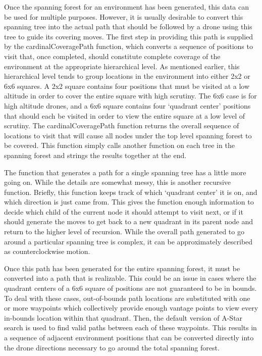 Once the spanning forest for an environment has been generated, this data can be used for multiple purposes. However, it is usually desirable to convert this spanning tree into the actual path that should be followed by a drone using this tree to guide its covering moves. The first step in providing this path is supplied by the cardinalCoveragePath function, which converts a sequence of positions to visit that, once completed, should constitute complete coverage of the environment at the appropriate hierarchical level. As mentioned earlier, this hierarchical level tends to group locations in the environment into either 2x2 or 6x6 squares. A 2x2 square contains four positions that must be visited at a low altitude in order to cover the entire square with high scrutiny. The 6x6 case is for high altitude drones, and a 6x6 square contains four `quadrant center' positions that should each be visited in order to view the entire square at a low level of scrutiny. The cardinalCoveragePath function returns the overall sequence of locations to visit that will cause all nodes under the top level spanning forest to be covered. This function simply calls another function on each tree in the spanning forest and strings the results together at the end.

The function that generates a path for a single spanning tree has a little more going on. While the details are somewhat messy, this is another recursive function. Briefly, this function keeps track of which `quadrant center' it is on, and which direction is just came from. This gives the function enough information to decide which child of the current node it should attempt to visit next, or if it should generate the moves to get back to a new quadrant in its parent node and return to the higher level of recursion. While the overall path generated to go around a particular spanning tree is complex, it can be approximately described as counterclockwise motion.

Once this path has been generated for the entire spanning forest, it must be converted into a path that is realizable. This could be an issue in cases where the quadrant centers of a 6x6 square of positions are not guaranteed to be in bounds. To deal with these cases, out-of-bounds path locations are substituted with one or more waypoints which collectively provide enough vantage points to view every in-bounds location within that quadrant. Then, the default version of A-Star search is used to find valid paths between each of these waypoints. This results in a sequence of adjacent environment positions that can be converted directly into the drone directions necessary to go around the total spanning forest.

